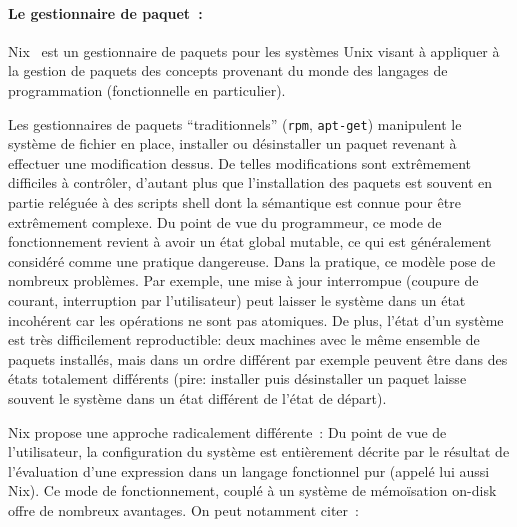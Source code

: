 \paragraph{Le gestionnaire de paquet :}

Nix \cite{phdeelco} est un gestionnaire de paquets pour les systèmes Unix visant à appliquer à
la gestion de paquets des concepts provenant du monde des langages de
programmation (fonctionnelle en particulier).

Les gestionnaires de paquets ``traditionnels'' (\verb|rpm|, \verb|apt-get|)
manipulent le système de fichier en place, installer ou désinstaller un paquet
revenant à effectuer une modification dessus. De telles modifications sont
extrêmement difficiles à contrôler, d'autant plus que l'installation des
paquets est souvent en partie reléguée à des scripts shell dont la sémantique
est connue pour être extrêmement complexe.
Du point de vue du programmeur, ce mode de fonctionnement revient à avoir un
état global mutable, ce qui est généralement considéré comme une pratique
dangereuse.
Dans la pratique, ce modèle pose de nombreux problèmes. Par exemple, une mise à
jour interrompue (coupure de courant, interruption par l'utilisateur) peut
laisser le système dans un état incohérent car les opérations ne sont pas
atomiques.
De plus, l'état d'un système est très difficilement reproductible: deux
machines avec le même ensemble de paquets installés, mais dans un ordre
différent par exemple peuvent être dans des états totalement différents (pire:
installer puis désinstaller un paquet laisse souvent le système dans un état
différent de l'état de départ).

Nix propose une approche radicalement différente : Du point de vue de
l'utilisateur, la configuration du système est entièrement décrite par le
résultat de l'évaluation d'une expression dans un langage fonctionnel pur
(appelé lui aussi Nix). Ce mode de fonctionnement, couplé à un système de
mémoïsation on-disk offre de nombreux avantages. On peut notamment citer :

